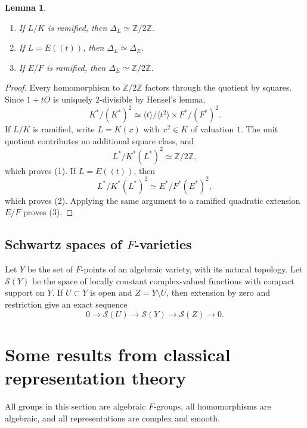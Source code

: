 \documentclass[11pt,a4paper,twoside]{amsart}
\newtheorem{lemma}[theorem]{Lemma}
\theoremstyle{definition}
\theoremstyle{remark}
\newcommand{\D}{\Delta}
\newcommand{\mcS}{\mathcal S}
\newcommand{\ZZ}{\mathbb Z}
\newcommand{\sm}{\setminus}
\begin{document}
\begin{lemma}\label{tori}
\begin{enumerate}
\item If $L/K$ is ramified, then $\D_L\simeq\ZZ/2\ZZ$.
\item If $L=E((t))$, then $\D_L\simeq\D_E$.
\item If $E/F$ is ramified, then $\D_E\simeq\ZZ/2\ZZ$.
\end{enumerate}
\end{lemma}
\begin{proof}
Every homomorphism to $\ZZ/2\ZZ$ factors through the quotient by squares. Since $1+tO$ is uniquely $2$-divisible by Hensel's lemma,
$$
K^*/(K^*)^2\simeq\langle t\rangle/\langle t^2\rangle\times F^*/(F^*)^2.
$$
If $L/K$ is ramified, write $L=K(x)$ with $x^2\in K$ of valuation $1$. The unit quotient contributes no additional square class, and
$$
L^*/K^*(L^*)^2\simeq\ZZ/2\ZZ,
$$
which proves (1). If $L=E((t))$, then
$$
L^*/K^*(L^*)^2\simeq E^*/F^*(E^*)^2,
$$
which proves (2). Applying the same argument to a ramified quadratic extension $E/F$ proves (3).
\end{proof}
\subsection{Schwartz spaces of $F$-varieties}
Let $Y$ be the set of $F$-points of an algebraic variety, with its natural topology. Let $\mcS(Y)$ be the space of locally constant complex-valued functions with compact support on $Y$. If $U\subset Y$ is open and $Z=Y\sm U$, then extension by zero and restriction give an exact sequence
$$
0\longrightarrow\mcS(U)\longrightarrow\mcS(Y)\longrightarrow\mcS(Z)\longrightarrow0.
$$
\section{Some results from classical representation theory}\label{reptheory}
All groups in this section are algebraic $F$-groups, all homomorphisms are algebraic, and all representations are complex and smooth.
\end{document}
